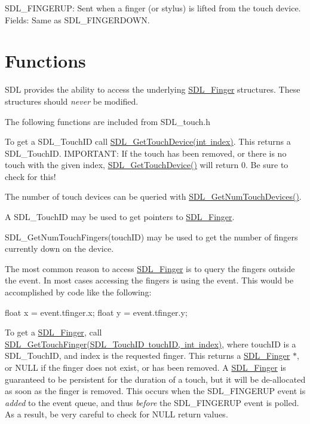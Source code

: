 S\+D\+L\+\_\+\+F\+I\+N\+G\+E\+R\+UP\+: Sent when a finger (or stylus) is lifted from the touch device. Fields\+: Same as S\+D\+L\+\_\+\+F\+I\+N\+G\+E\+R\+D\+O\+WN.



 \section*{Functions }

S\+DL provides the ability to access the underlying \mbox{\hyperlink{struct_s_d_l___finger}{S\+D\+L\+\_\+\+Finger}} structures. These structures should {\itshape never} be modified.

The following functions are included from S\+D\+L\+\_\+touch.\+h

To get a S\+D\+L\+\_\+\+Touch\+ID call \mbox{\hyperlink{_s_d_l__touch_8h_af23f09dc79eace93cdc8dd770eed0d0a}{S\+D\+L\+\_\+\+Get\+Touch\+Device(int index)}}. This returns a S\+D\+L\+\_\+\+Touch\+ID. I\+M\+P\+O\+R\+T\+A\+NT\+: If the touch has been removed, or there is no touch with the given index, \mbox{\hyperlink{_s_d_l__touch_8h_af23f09dc79eace93cdc8dd770eed0d0a}{S\+D\+L\+\_\+\+Get\+Touch\+Device()}} will return 0. Be sure to check for this!

The number of touch devices can be queried with \mbox{\hyperlink{_s_d_l__touch_8h_a14a41a2964ddf868a180e42ccfd441d1}{S\+D\+L\+\_\+\+Get\+Num\+Touch\+Devices()}}.

A S\+D\+L\+\_\+\+Touch\+ID may be used to get pointers to \mbox{\hyperlink{struct_s_d_l___finger}{S\+D\+L\+\_\+\+Finger}}.

S\+D\+L\+\_\+\+Get\+Num\+Touch\+Fingers(touch\+I\+D) may be used to get the number of fingers currently down on the device.

The most common reason to access \mbox{\hyperlink{struct_s_d_l___finger}{S\+D\+L\+\_\+\+Finger}} is to query the fingers outside the event. In most cases accessing the fingers is using the event. This would be accomplished by code like the following\+: \begin{DoxyVerb}  float x = event.tfinger.x;
  float y = event.tfinger.y;
\end{DoxyVerb}


To get a \mbox{\hyperlink{struct_s_d_l___finger}{S\+D\+L\+\_\+\+Finger}}, call \mbox{\hyperlink{_s_d_l__touch_8h_a50902a3c1e4dba0b82cb73cb786dae41}{S\+D\+L\+\_\+\+Get\+Touch\+Finger(\+S\+D\+L\+\_\+\+Touch\+I\+D touch\+I\+D, int index)}}, where touch\+ID is a S\+D\+L\+\_\+\+Touch\+ID, and index is the requested finger. This returns a \mbox{\hyperlink{struct_s_d_l___finger}{S\+D\+L\+\_\+\+Finger}} $\ast$, or N\+U\+LL if the finger does not exist, or has been removed. A \mbox{\hyperlink{struct_s_d_l___finger}{S\+D\+L\+\_\+\+Finger}} is guaranteed to be persistent for the duration of a touch, but it will be de-\/allocated as soon as the finger is removed. This occurs when the S\+D\+L\+\_\+\+F\+I\+N\+G\+E\+R\+UP event is {\itshape added} to the event queue, and thus {\itshape before} the S\+D\+L\+\_\+\+F\+I\+N\+G\+E\+R\+UP event is polled. As a result, be very careful to check for N\+U\+LL return values.

